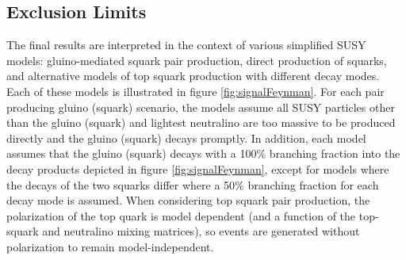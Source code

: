 \subsection{Exclusion Limits}
\label{subsec:exclusionLimits}

The final results are interpreted in the context of various simplified SUSY models: gluino-mediated squark pair production, direct production of squarks, and alternative models of top squark production with different decay modes. Each of these models is illustrated in figure \ref{fig:signalFeynman}. For each pair producing gluino (squark) scenario, the models assume all SUSY particles other than the gluino (squark) and lightest neutralino are too massive to be produced directly and the gluino (squark) decays promptly. In addition, each model assumes that the gluino (squark) decays with a 100\% branching fraction into the decay products depicted in figure \ref{fig:signalFeynman}, except for models where the decays of the two squarks differ where a 50\% branching fraction for each decay mode is assumed. When considering top squark pair production, the polarization of the top quark is model dependent (and a function of the top-squark and neutralino mixing matrices), so events are generated without polarization to remain model-independent.
